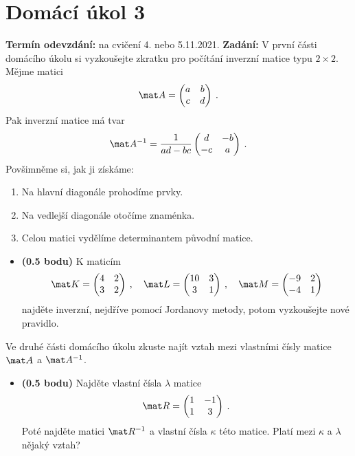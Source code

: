 \section*{Domácí úkol 3}
\textbf{Termín odevzdání:} na cvičení 4. nebo 5.11.2021.
\newline
\textbf{Zadání:} V první části domácího úkolu si vyzkoušejte zkratku pro počítání inverzní matice typu $2 \times 2$. Mějme matici \begin{align}
    \mat A = \begin{pmatrix}
        a & b \\ c & d
    \end{pmatrix} \:.
\end{align}
Pak inverzní matice má tvar
\begin{align}
    \mat A^{-1} = \frac{1}{ad-bc} \begin{pmatrix}
        d & -b \\ -c & a 
    \end{pmatrix} \:.
\end{align}
Povšimněme si, jak ji získáme:
\begin{enumerate}
    \item Na hlavní diagonále prohodíme prvky.
    \item Na vedlejší diagonále otočíme znaménka.
    \item Celou matici vydělíme determinantem původní matice.
\end{enumerate}

\begin{itemize}
    \item \textbf{(0.5 bodu)} K maticím
    \begin{align}
        \mat K = \begin{pmatrix}
            4 & 2 \\ 3 & 2
        \end{pmatrix} \:,\quad
        \mat L = \begin{pmatrix}
            10 & 3 \\ 3& 1
        \end{pmatrix} \:,\quad
        \mat M = \begin{pmatrix}
            -9 & 2 \\ -4 & 1
        \end{pmatrix}
    \end{align}
    najděte inverzní, nejdříve pomocí Jordanovy metody, potom vyzkoušejte nové pravidlo.
\end{itemize}

Ve druhé části domácího úkolu zkuste najít vztah mezi vlastními čísly matice $\mat A$ a $\mat A^{-1}$.
\begin{itemize}
    \item \textbf{(0.5 bodu)} Najděte vlastní čísla $\lambda$ matice \begin{align}
        \mat R = \begin{pmatrix}
            1 & -1 \\ 1 & 3
        \end{pmatrix} \:.
    \end{align}
    Poté najděte matici $\mat R^{-1}$ a vlastní čísla $\kappa$ této matice. Platí mezi $\kappa$ a $\lambda$ nějaký vztah?
\end{itemize}

